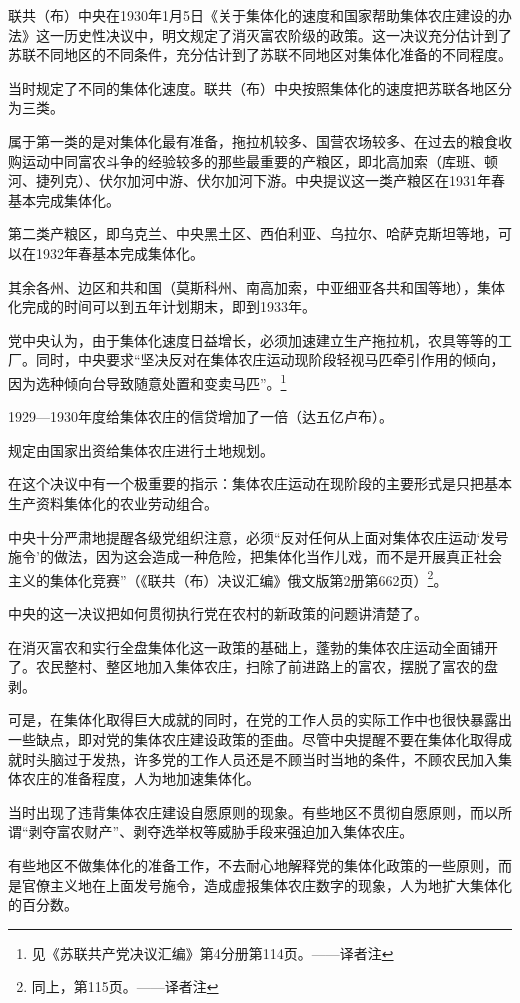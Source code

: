 联共（布）中央在1930年1月5日《关于集体化的速度和国家帮助集体农庄建设的办法》这一历史性决议中，明文规定了消灭富农阶级的政策。这一决议充分估计到了苏联不同地区的不同条件，充分估计到了苏联不同地区对集体化准备的不同程度。

当时规定了不同的集体化速度。联共（布）中央按照集体化的速度把苏联各地区分为三类。

属于第一类的是对集体化最有准备，拖拉机较多、国营农场较多、在过去的粮食收购运动中同富农斗争的经验较多的那些最重要的产粮区，即北高加索（库班、顿河、捷列克）、伏尔加河中游、伏尔加河下游。中央提议这一类产粮区在1931年春基本完成集体化。

第二类产粮区，即乌克兰、中央黑土区、西伯利亚、乌拉尔、哈萨克斯坦等地，可以在1932年春基本完成集体化。

其余各州、边区和共和国（莫斯科州、南高加索，中亚细亚各共和国等地），集体化完成的时间可以到五年计划期末，即到1933年。

党中央认为，由于集体化速度日益增长，必须加速建立生产拖拉机，农具等等的工厂。同时，中央要求“坚决反对在集体农庄运动现阶段轻视马匹牵引作用的倾向，因为选种倾向台导致随意处置和变卖马匹”。\footnote{见《苏联共产党决议汇编》第4分册第114页。——译者注}

1929—1930年度给集体农庄的信贷增加了一倍（达五亿卢布）。

规定由国家出资给集体农庄进行土地规划。

在这个决议中有一个极重要的指示：集体农庄运动在现阶段的主要形式是只把基本生产资料集体化的农业劳动组合。

中央十分严肃地提醒各级党组织注意，必须“反对任何从上面对集体农庄运动‘发号施令’的做法，因为这会造成一种危险，把集体化当作儿戏，而不是开展真正社会主义的集体化竞赛”（《联共（布）决议汇编》俄文版第2册第662页）\footnote{同上，第115页。——译者注}。

中央的这一决议把如何贯彻执行党在农村的新政策的问题讲清楚了。

在消灭富农和实行全盘集体化这一政策的基础上，蓬勃的集体农庄运动全面铺开了。农民整村、整区地加入集体农庄，扫除了前进路上的富农，摆脱了富农的盘剥。

可是，在集体化取得巨大成就的同时，在党的工作人员的实际工作中也很快暴露出一些缺点，即对党的集体农庄建设政策的歪曲。尽管中央提醒不要在集体化取得成就时头脑过于发热，许多党的工作人员还是不顾当时当地的条件，不顾农民加入集体农庄的准备程度，人为地加速集体化。

当时出现了违背集体农庄建设自愿原则的现象。有些地区不贯彻自愿原则，而以所谓“剥夺富农财产”、剥夺选举权等威胁手段来强迫加入集体农庄。

有些地区不做集体化的准备工作，不去耐心地解释党的集体化政策的一些原则，而是官僚主义地在上面发号施令，造成虚报集体农庄数字的现象，人为地扩大集体化的百分数。

